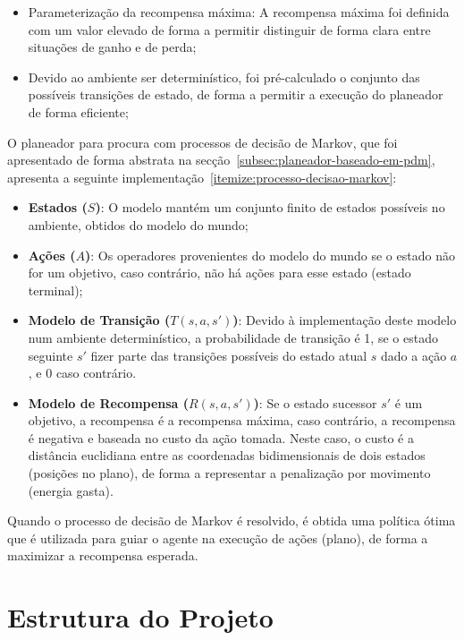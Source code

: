 \begin{itemize}
    \item Parameterização da recompensa máxima: A recompensa máxima foi definida com um valor elevado de forma a permitir distinguir de forma clara entre situações de ganho e de perda;
    \item Devido ao ambiente ser determinístico, foi pré-calculado o conjunto das possíveis transições de estado, de forma a permitir a execução do planeador de forma eficiente;
\end{itemize}

O planeador para procura com processos de decisão de Markov, que foi apresentado de forma abstrata na secção~\ref{subsec:planeador-baseado-em-pdm},
apresenta a seguinte implementação~\ref{itemize:processo-decisao-markov}:

\begin{itemize}
    \item \textbf{Estados (\(S\))}: O modelo mantém um conjunto finito de estados possíveis no ambiente, obtidos do modelo do mundo;
    \item \textbf{Ações (\(A\))}: Os operadores provenientes do modelo do mundo se o estado não for um objetivo, caso contrário, não há ações para esse estado (estado terminal);
    \item \textbf{Modelo de Transição (\(T(s, a, s')\))}: Devido à implementação deste modelo num ambiente determinístico, a probabilidade de transição é 1, se o estado seguinte \(s'\) fizer parte das transições possíveis do estado atual \(s\) dado a ação \(a\), e 0 caso contrário.
    \item \textbf{Modelo de Recompensa (\(R(s, a, s')\))}: Se o estado sucessor \(s'\) é um objetivo, a recompensa é a recompensa máxima, caso contrário, a recompensa é negativa e baseada no custo da ação tomada.
    Neste caso, o custo é a distância euclidiana entre as coordenadas bidimensionais de dois estados (posições no plano), de forma a representar a penalização por movimento (energia gasta).
\end{itemize}

Quando o processo de decisão de Markov é resolvido, é obtida uma política ótima que é utilizada para guiar o agente na execução de ações (plano), de forma a maximizar a recompensa esperada.

\section{Estrutura do Projeto}\label{sec:estrutura-do-projeto-4}

